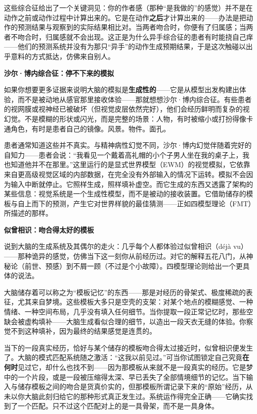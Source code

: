 \documentclass[11pt, twoside, openright]{book}
\begin{document}
这些综合征给出了一个关键洞见：你的作者感（那种“是我做的”的感觉）并不是在动作之前或动作过程中计算出来的。它是在动作\textbf{之后}才计算出来的------办法是把动作的预测结果与观察到的实际结果相比对。当两者吻合时，你便有了归属感；当两者不吻合时，归属感就不会出现。这正是为什么异手综合征的患者有时能挠自己痒------他们的预测系统并没有为那只“异手”的动作生成预期结果，于是这次触碰以出乎意料的方式抵达，仿佛来自别人。

\textbf{沙尔·博内综合征：停不下来的模拟}

如果你想要更多证据来说明大脑的模拟是\textbf{生成性的}------它是从模型出发构建出体验，而不是被动地从感官那里接收体验------那就想想沙尔·博内综合征。有些患者的视网膜或视神经已被破坏（但视觉皮层依然完好），他们会经历鲜明而复杂的视幻觉。不是模糊的形状或闪光，而是完整的场景：人物，有时被缩小或打扮得像卡通角色，有时是患者自己的镜像。风景。物件。面孔。

患者通常知道这些并不真实。与精神病性幻觉不同，沙尔·博内幻觉伴随着完好的自知力------患者会说：“我看见一个戴着高礼帽的小个子男人坐在我的桌子上，我也知道他并不在那里。”这里运行的是显式世界模型（EWM）的视觉模拟，它依靠来自更高级视觉区域的内部数据，在完全没有外部输入的情况下运转。模拟不会因为输入中断就停止。它照样生成，照样填补虚空。而它生成的东西又透露了架构的某些信息：视觉系统是一个生成性模型，而不是被动的接收装置。它借助储存的模板与自上而下的预测，产生它对世界样貌的最佳猜测------正如四模型理论（FMT）所描述的那样。

\textbf{似曾相识：吻合得太好的模板}

说到大脑的生成系统及其偶尔的走火：几乎每个人都体验过似曾相识（déjà vu）------那种诡异的感觉，仿佛当下这一刻你从前经历过。对它的解释五花八门，从神秘论（前世、预感）到不屑一顾（不过是个小故障）。四模型理论则给出一个更具体的说法。

大脑储存着可以称之为“模板记忆”的东西------那是对经历的骨架式、极度稀疏的表征，尤其来自梦境。这些模板大多只是空壳的支架：对某个地点的模糊感觉、一种情绪、一种空间布局，几乎没有填入任何细节。当你提取一段正常记忆时，那些空缺会被虚构填补------大脑生成看似合理的细节，以造出一段天衣无缝的体验。你察觉不到这种填补，因为最终的结果感觉是连贯的。

当下的一段真实经历，恰好与某个储存的模板吻合得太过接近时，似曾相识便发生了。大脑的模式匹配系统随之激活：“这我以前见过。”可当你试图锁定自己究竟\textbf{在何时}见过它，却什么也找不到------因为那模板从来就不是一段真实的经历。它是梦中的一个片段，或是一段被压缩得太深、早已丢失了全部情境细节的记忆。当下输入与储存模板之间的吻合是货真价实的，但那模板所谓记录下来的“原始”经历，从未以你大脑此刻归给它的那种形式真正发生过。系统运作得完全正确------它确实找到了一个匹配。只不过这个匹配对上的是一具骨架，而不是一具身体。
\end{document}

